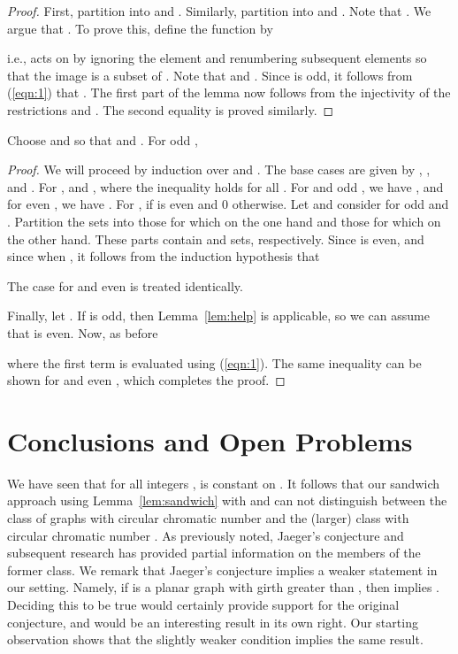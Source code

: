 \documentclass[11pt,a4paper]{article}
\begin{document}
  \begin{proof}
    First, partition  into  and .
    Similarly, partition  into  and .
    Note that .
    We argue that .
    To prove this, define the function  by

i.e.,  acts on  by ignoring the element  and renumbering
    subsequent elements so that the image is a subset of .
    Note that  and .
    Since  is odd, it follows from (\ref{eqn:1}) that
    .
    The first part of the lemma now follows from the injectivity of
    the restrictions  and .
    The second equality is proved similarly.
\end{proof}

  \begin{lemma} \label{lem:ineq}
    Choose  and  so that  and .
    For odd ,
    
\end{lemma}
  
  \begin{proof}
    We will proceed by induction over  and .
    The base cases are given by , , and .
    For ,
 and ,
where the inequality holds for all .
    For  and odd , we have , and for
    even , we have .
    For ,
 if  is even and 0 otherwise.
Let  and consider  for odd  and .
    Partition the sets  into those for which 
     on the one hand and those for which
     on the other hand.
    These parts contain  and  sets,
    respectively.
    Since  is even, and since  when , 
    it follows from the induction hypothesis that

The case for  and even  is treated identically.

    Finally, let .
    If  is odd, then Lemma~\ref{lem:help} is applicable, 
    so we can assume that  is even.
Now, as before

where the first term is evaluated using (\ref{eqn:1}).
    The same inequality can be shown for 
    and even ,
    which completes the proof.
\end{proof}

\section{Conclusions and Open Problems}
\label{sec:open}

We have seen that for all integers ,  is constant on .
It follows that our sandwich approach using Lemma~\ref{lem:sandwich} with 
and  can not distinguish between the class
of graphs with circular chromatic number  and the (larger) class with
circular chromatic number .
As previously noted, Jaeger's conjecture and subsequent research
has provided partial information on the members of the former class.
We remark that Jaeger's conjecture implies a weaker statement in our
setting. Namely, if  is a planar graph with girth greater than ,
then  implies . Deciding this to be true would certainly provide support for
the original conjecture, and would be an interesting result in its
own right.
Our starting observation shows that the slightly weaker condition
 implies the same result.
\end{document}
